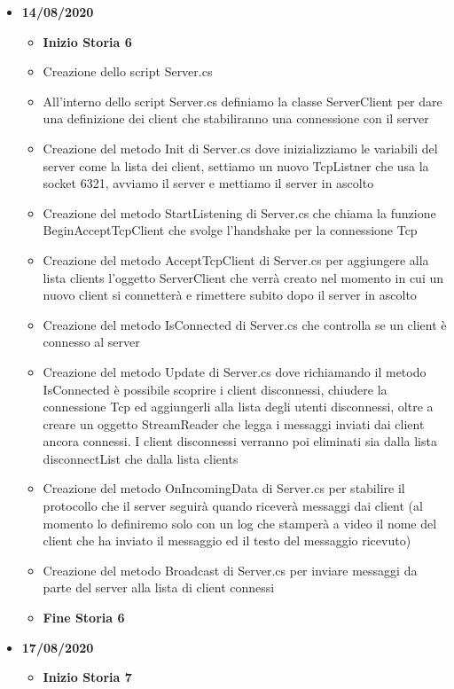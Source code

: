 \documentclass[12pt]{article}
\begin{document}
\begin{itemize}
\item \textbf{14/08/2020}
	\begin{itemize}
	\item \textbf{Inizio Storia 6}
	\item Creazione dello script Server.cs
	\item All'interno dello script Server.cs definiamo la classe ServerClient per dare una definizione dei client che stabiliranno una connessione con il server
	\item Creazione del metodo Init di Server.cs dove inizializziamo le variabili del server come la lista dei client, settiamo un nuovo TcpListner che usa la socket 6321, avviamo il server e mettiamo il server in ascolto
	\item Creazione del metodo StartListening di Server.cs che chiama la funzione BeginAcceptTcpClient che svolge l'handshake per la connessione Tcp
	\item Creazione del metodo AcceptTcpClient di Server.cs per aggiungere alla lista clients l'oggetto ServerClient che verrà creato nel momento in cui un nuovo client si connetterà e rimettere subito dopo il server in ascolto
	\item Creazione del metodo IsConnected di Server.cs che controlla se un client è connesso al server
	\item Creazione del metodo Update di Server.cs dove richiamando il metodo IsConnected è possibile scoprire i client disconnessi, chiudere la connessione Tcp ed aggiungerli alla lista degli utenti disconnessi, oltre a creare un oggetto StreamReader che legga i messaggi inviati dai client ancora connessi. I client disconnessi verranno poi eliminati sia dalla lista disconnectList che dalla lista clients
	\item Creazione del metodo OnIncomingData di Server.cs per stabilire il protocollo che il server seguirà quando riceverà messaggi dai client (al momento lo definiremo solo con un log che stamperà a video il nome del client che ha inviato il messaggio ed il testo del messaggio ricevuto)
	\item Creazione del metodo Broadcast di Server.cs per inviare messaggi da parte del server alla lista di client connessi
	\item \textbf{Fine Storia 6}
	\end{itemize}
\item \textbf{17/08/2020}
	\begin{itemize}
	\item \textbf{Inizio Storia 7}

\end{itemize}
\end{itemize}
\end{document}
